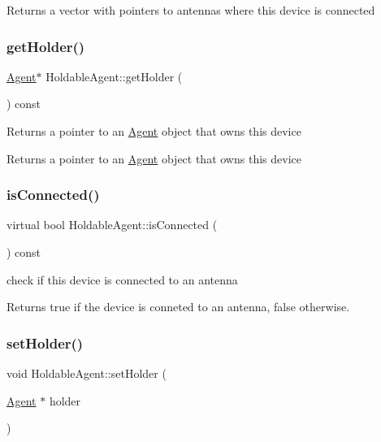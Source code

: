 \begin{DoxyReturn}{Returns}
a vector with pointers to antennas where this device is connected 
\end{DoxyReturn}
\mbox{\label{class_holdable_agent_a51f29e5aecf9d288935ddae6da4096ed}} 
\subsubsection{\texorpdfstring{get\+Holder()}{getHolder()}}
{\footnotesize\ttfamily \hyperlink{class_agent}{Agent}$\ast$ Holdable\+Agent\+::get\+Holder (\begin{DoxyParamCaption}{ }\end{DoxyParamCaption}) const}

Returns a pointer to an \hyperlink{class_agent}{Agent} object that owns this device \begin{DoxyReturn}{Returns}
a pointer to an \hyperlink{class_agent}{Agent} object that owns this device 
\end{DoxyReturn}
\mbox{\label{class_holdable_agent_a1578388e51fefe7c19cd3b7c93a184eb}} 
\subsubsection{\texorpdfstring{is\+Connected()}{isConnected()}}
{\footnotesize\ttfamily virtual bool Holdable\+Agent\+::is\+Connected (\begin{DoxyParamCaption}{ }\end{DoxyParamCaption}) const\hspace{0.3cm}{\ttfamily [virtual]}}

check if this device is connected to an antenna \begin{DoxyReturn}{Returns}
true if the device is conneted to an antenna, false otherwise. 
\end{DoxyReturn}
\mbox{\label{class_holdable_agent_a39b53c9c6cacca716f38fccc520e9f52}} 
\subsubsection{\texorpdfstring{set\+Holder()}{setHolder()}}
{\footnotesize\ttfamily void Holdable\+Agent\+::set\+Holder (\begin{DoxyParamCaption}\item[{\hyperlink{class_agent}{Agent} $\ast$}]{holder }\end{DoxyParamCaption})}

